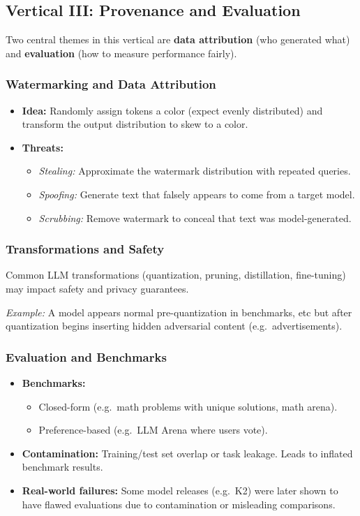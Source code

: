 \documentclass[11pt]{article}
\begin{document}

\subsection{Vertical III: Provenance and Evaluation}
\label{sub:provenance_intro}
Two central themes in this vertical are \textbf{data attribution} (who generated what) and \textbf{evaluation} (how to measure performance fairly).

\subsubsection{Watermarking and Data Attribution}
\begin{itemize}
	\item \textbf{Idea:} Randomly assign tokens a color (expect evenly distributed) and transform the output distribution to skew to a color.
	\item \textbf{Threats:}
		\begin{itemize}
			\item \emph{Stealing:} Approximate the watermark distribution with repeated queries.
			\item \emph{Spoofing:} Generate text that falsely appears to come from a target model.
			\item \emph{Scrubbing:} Remove watermark to conceal that text was model-generated.
		\end{itemize}
\end{itemize}

\subsubsection{Transformations and Safety}
Common LLM transformations (quantization, pruning, distillation, fine-tuning) may impact safety and privacy guarantees.  

\emph{Example:} A model appears normal pre-quantization in benchmarks, etc but after quantization begins inserting hidden adversarial content (e.g.\ advertisements).

\subsubsection{Evaluation and Benchmarks}
\begin{itemize}
	\item \textbf{Benchmarks:}
	      \begin{itemize}
		      \item Closed-form (e.g.\ math problems with unique solutions, math arena).
		      \item Preference-based (e.g.\ LLM Arena where users vote).
	      \end{itemize}
	\item \textbf{Contamination:} Training/test set overlap or task leakage.  
	      Leads to inflated benchmark results.
	\item \textbf{Real-world failures:} Some model releases (e.g.\ K2) were later shown to have flawed evaluations due to contamination or misleading comparisons.
\end{itemize}
\newpage
\end{document}
